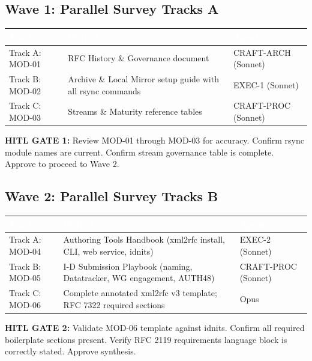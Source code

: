 \documentclass[11pt,letterpaper]{article}
\newcommand{\tableheader}[1]{\textbf{\sffamily\textcolor{white}{#1}}}
\begin{document}
\subsection{Wave 1: Parallel Survey Tracks A}

\begin{center}
\begin{tabularx}{\textwidth}{L{3cm}L{5cm}X}
\toprule
{}
\tableheader{Track} & \tableheader{Output} & \tableheader{Agent} \\
\midrule
Track A: MOD-01 & RFC History \& Governance document & CRAFT-ARCH (Sonnet) \\
Track B: MOD-02 & Archive \& Local Mirror setup guide with all rsync commands & EXEC-1 (Sonnet) \\
Track C: MOD-03 & Streams \& Maturity reference tables & CRAFT-PROC (Sonnet) \\
\bottomrule
\end{tabularx}
\end{center}

\textbf{HITL GATE 1:} Review MOD-01 through MOD-03 for accuracy. Confirm rsync module names are current. Confirm stream governance table is complete. Approve to proceed to Wave 2.

\subsection{Wave 2: Parallel Survey Tracks B}

\begin{center}
\begin{tabularx}{\textwidth}{L{3cm}L{5cm}X}
\toprule
{}
\tableheader{Track} & \tableheader{Output} & \tableheader{Agent} \\
\midrule
Track A: MOD-04 & Authoring Tools Handbook (xml2rfc install, CLI, web service, idnits) & EXEC-2 (Sonnet) \\
Track B: MOD-05 & I-D Submission Playbook (naming, Datatracker, WG engagement, AUTH48) & CRAFT-PROC (Sonnet) \\
Track C: MOD-06 & Complete annotated xml2rfc v3 template; RFC 7322 required sections & Opus \\
\bottomrule
\end{tabularx}
\end{center}

\textbf{HITL GATE 2:} Validate MOD-06 template against idnits. Confirm all required boilerplate sections present. Verify RFC 2119 requirements language block is correctly stated. Approve synthesis.
\end{document}
